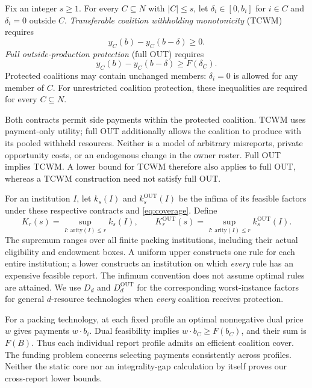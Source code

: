 \begin{definition}\label{def:contracts}
Fix an integer $s\ge1$. For every $C\subseteq N$ with $|C|\le s$, let
$\delta_i\in[0,b_i]$ for $i\in C$ and $\delta_i=0$ outside $C$.
\emph{Transferable coalition withholding monotonicity} (TCWM) requires
\begin{equation}\label{eq:tcwm}
 y_C(b)-y_C(b-\delta)\ge0.
\end{equation}
\emph{Full outside-production protection} (full OUT) requires
\begin{equation}\label{eq:out}
 y_C(b)-y_C(b-\delta)\ge F(\delta_C).
\end{equation}
Protected coalitions may contain unchanged members: $\delta_i=0$ is allowed
for any member of $C$. For unrestricted coalition protection, these
inequalities are required for every $C\subseteq N$.
\end{definition}

Both contracts permit side payments within the protected coalition. TCWM
uses payment-only utility; full OUT additionally allows the coalition to
produce with its pooled withheld resources. Neither is a model of arbitrary
misreports, private opportunity costs, or an endogenous change in the owner
roster. Full OUT implies TCWM. A lower bound for TCWM therefore also applies
to full OUT, whereas a TCWM construction need not satisfy full OUT.

For an institution $I$, let $k_s(I)$ and $k_s^{\mathrm{OUT}}(I)$ be the
infima of its feasible factors under these respective contracts and
\eqref{eq:coverage}. Define
\begin{equation}\label{eq:frontiers}
 K_r(s)=\sup_{I:\,\text{arity}(I)\le r} k_s(I),\qquad
 K_r^{\mathrm{OUT}}(s)=\sup_{I:\,\text{arity}(I)\le r}
 k_s^{\mathrm{OUT}}(I).
\end{equation}
The supremum ranges over all finite packing institutions, including their
actual eligibility and endowment boxes. A uniform upper constructs one rule
for each entire institution; a lower constructs an institution on which
\emph{every} rule has an expensive feasible report. The infimum convention
does not assume optimal rules are attained. We use $D_d$ and
$D_d^{\mathrm{OUT}}$ for the corresponding worst-instance factors for general
$d$-resource technologies when \emph{every} coalition receives protection.

\begin{remark}\label{rem:static}
For a packing technology, at each fixed profile an optimal nonnegative dual
price $w$ gives payments $w\cdot b_i$. Dual feasibility implies
$w\cdot b_C\ge F(b_C)$, and their sum is $F(B)$.
Thus each individual report profile admits an efficient coalition cover.
The funding problem concerns selecting payments consistently across profiles.
Neither the static core nor an integrality-gap calculation by itself proves
our cross-report lower bounds.
\end{remark}

